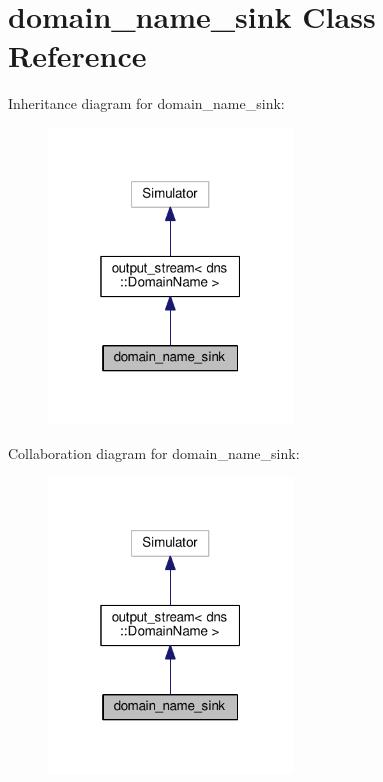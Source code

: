 \hypertarget{classdomain__name__sink}{}\section{domain\+\_\+name\+\_\+sink Class Reference}
\label{classdomain__name__sink}


Inheritance diagram for domain\+\_\+name\+\_\+sink\+:
\nopagebreak
\begin{figure}[H]
\begin{center}
\leavevmode
\includegraphics[width=184pt]{classdomain__name__sink__inherit__graph}
\end{center}
\end{figure}


Collaboration diagram for domain\+\_\+name\+\_\+sink\+:
\nopagebreak
\begin{figure}[H]
\begin{center}
\leavevmode
\includegraphics[width=184pt]{classdomain__name__sink__coll__graph}
\end{center}
\end{figure}
